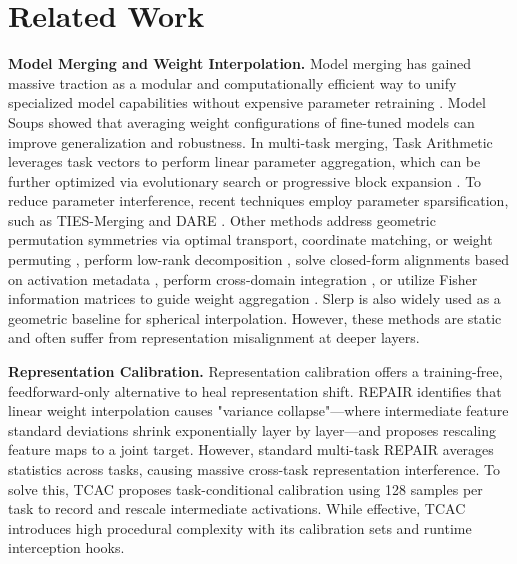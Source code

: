 \documentclass{article}
\theoremstyle{plain}
\theoremstyle{definition}
\theoremstyle{remark}
\begin{document}
\section{Related Work}
\label{related}

\textbf{Model Merging and Weight Interpolation.} Model merging has gained massive traction as a modular and computationally efficient way to unify specialized model capabilities without expensive parameter retraining \cite{wortsman2022soups, ilharco2022arithmetic}. Model Soups \cite{wortsman2022soups} showed that averaging weight configurations of fine-tuned models can improve generalization and robustness. In multi-task merging, Task Arithmetic \cite{ilharco2022arithmetic} leverages task vectors to perform linear parameter aggregation, which can be further optimized via evolutionary search \cite{akiba2024evolutionary} or progressive block expansion \cite{wu2024llama}. To reduce parameter interference, recent techniques employ parameter sparsification, such as TIES-Merging \cite{yadav2023ties} and DARE \cite{yu2024dare}. Other methods address geometric permutation symmetries via optimal transport, coordinate matching, or weight permuting \cite{ainsworth2023rebasin, stoica2023zipit}, perform low-rank decomposition \cite{gargiulo2025svdmerging}, solve closed-form alignments based on activation metadata \cite{jin2023regmean}, perform cross-domain integration \cite{dontuparthi2024cross}, or utilize Fisher information matrices to guide weight aggregation \cite{matena2022fisher, matuskey2024fisher}. Slerp \cite{shoemake1985animating} is also widely used as a geometric baseline for spherical interpolation. However, these methods are static and often suffer from representation misalignment at deeper layers.

\textbf{Representation Calibration.} Representation calibration offers a training-free, feedforward-only alternative to heal representation shift. REPAIR \cite{jordan2022repair} identifies that linear weight interpolation causes "variance collapse"—where intermediate feature standard deviations shrink exponentially layer by layer—and proposes rescaling feature maps to a joint target. However, standard multi-task REPAIR averages statistics across tasks, causing massive cross-task representation interference. To solve this, TCAC \cite{anonymous_tcac} proposes task-conditional calibration using 128 samples per task to record and rescale intermediate activations. While effective, TCAC introduces high procedural complexity with its calibration sets and runtime interception hooks.
\end{document}
